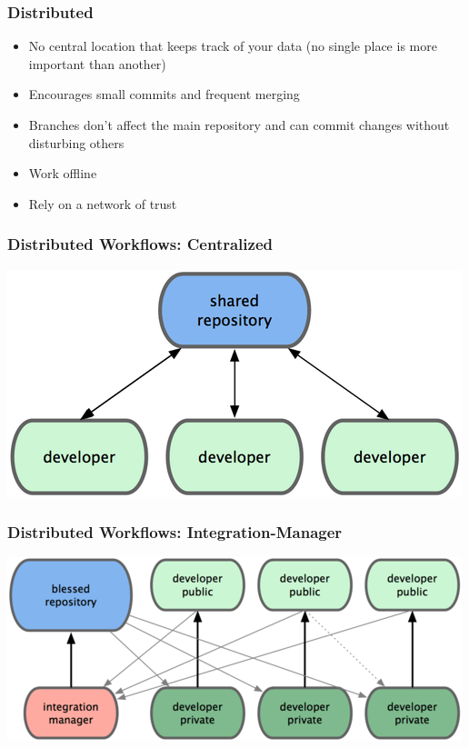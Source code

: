 \documentclass[english,compress]{beamer}
\begin{document}
\frame
{
    \frametitle{Distributed}
    \begin{itemize}
        \item No central location that keeps track of your data (no single place is more important than another)
        \item Encourages small commits and frequent merging
        \item Branches don't affect the main repository and can commit changes without disturbing others
        \item Work offline
        \item Rely on a network of trust
    \end{itemize}
}

\frame
{
    \frametitle{Distributed Workflows: Centralized}

    \begin{center}
        \includegraphics[width=.7\textwidth]{figs/centralized-workflow.png}
    \end{center}
}

\frame
{
    \frametitle{Distributed Workflows: Integration-Manager}

    \begin{center}
        \includegraphics[width=.7\textwidth]{figs/integration-manager-workflow.png}
    \end{center}

}
\end{document}
